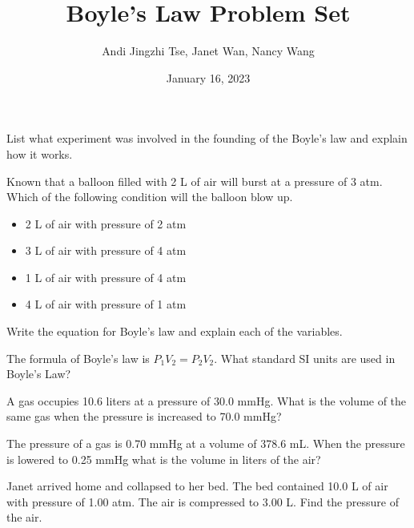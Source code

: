 \documentclass{article}
\title{Boyle's Law Problem Set}
\author{Andi Jingzhi Tse, Janet Wan, Nancy Wang}
\date{January 16, 2023}
\begin{document}
\maketitle
\begin{custom-big}[Example 1]
List what experiment was involved in the founding of the Boyle’s law and explain how it works.
\end{custom-big}

\begin{custom-big}[Example 2]
Known that a balloon filled with 2 L of air will burst at a pressure of 3 atm. Which of the following condition will the balloon blow up. 
\begin{itemize}
    \item[(A)] 2 L of air with pressure of 2 atm
    \item[(B)] 3 L of air with pressure of 4 atm
    \item[(C)] 1 L of air with pressure of 4 atm
    \item[(D)] 4 L of air with pressure of 1 atm
\end{itemize}
\end{custom-big}

\begin{custom-big}[Example 3]
Write the equation for Boyle’s law and explain each of the variables.
\end{custom-big}


\begin{custom-big}[Example 4]
The formula of Boyle's law is $P_1V_2=P_2V_2$. What standard SI units are used in Boyle's Law?
\end{custom-big}

\begin{custom-big}[Example 5]
A gas occupies 10.6 liters at a pressure of 30.0 mmHg. What is the volume of the same gas when the pressure is increased to 70.0 mmHg?
\end{custom-big}

\begin{custom-big}[Example 6]

The pressure of a gas is 0.70 mmHg at a volume of 378.6 mL. When the pressure is lowered to 0.25 mmHg what is the volume in liters of the air?
\end{custom-big}



\begin{custom-big}[Example 7]
Janet arrived home and collapsed to her bed. The bed contained 10.0 L of air with pressure of 1.00 atm. The air is compressed to 3.00 L. Find the pressure of the air. 
\end{custom-big}
\end{document}
